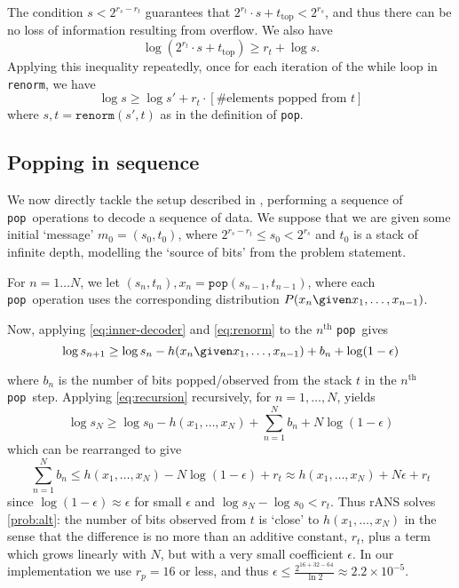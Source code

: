 \documentclass{article}
\newcommand{\pop}{\texttt{pop}}
\begin{document}
The condition \(s < 2^{r_s - r_t}\) guarantees that \(2^{r_t} \cdot s +
t_{\text{top}} < 2^{r_s}\), and thus there can be no loss of information
resulting from overflow. We also have
\begin{equation}
  \log (2^{r_t} \cdot s + t_\text{top}) \geq r_t + \log s.
\end{equation}
Applying this inequality repeatedly, once for each iteration of the while loop
in \texttt{renorm}, we have
\begin{equation}\label{eq:renorm}
\log s \geq \log s' + r_t\cdot\left[\text{\# elements popped from \(t\)}\right]
\end{equation}
where \(s, t = \texttt{renorm}(s', t)\) as in the definition of \pop.

\subsection{Popping in sequence}
We now directly tackle the setup described in , performing a
sequence of \pop\ operations to decode a sequence of data. We suppose that we
are given some initial `message' \(m_0= (s_0, t_0)\), where \(2^{r_s - r_t}
\leq s_0 < 2^{r_s}\) and \(t_0\) is a stack of infinite depth, modelling the
`source of bits' from the problem statement.

For \(n=1\ldots N\), we let \((s_n, t_n), x_n = \pop(s_{n-1}, t_{n-1})\), where
each \pop\ operation uses the corresponding distribution \(P(x_n\given
x_1,\ldots,x_{n-1})\).

Now, applying \cref{eq:inner-decoder} and \cref{eq:renorm} to the
\(n^\mathrm{th}\) \pop\ gives
\begin{equation}\label{eq:recursion}
  \log s_{n+1} \geq \log s_n - h(x_n\given x_1,\ldots,x_{n-1}) + b_n + \log (1
  - \epsilon)
\end{equation}

where \(b_n\) is the number of bits popped/observed from the stack \(t\) in the
\(n^{\mathrm{th}}\) \pop\ step. Applying \cref{eq:recursion} recursively, for
\(n=1,\ldots, N\), yields
\begin{equation}
  \log s_N \geq \log s_0 - h(x_1, \ldots, x_N) + \sum_{n=1}^{N} b_n +
  N\log(1-\epsilon)
\end{equation}
which can be rearranged to give
\begin{equation}
  \sum_{n=1}^Nb_n \leq h(x_1, \ldots, x_N) - N\log(1-\epsilon) + r_t
  \approx h(x_1, \ldots, x_N) + N\epsilon + r_t
\end{equation}
since \(\log(1 - \epsilon)\approx\epsilon\) for small \(\epsilon\) and \(\log
s_N - \log s_0 < r_t\). Thus rANS solves \cref{prob:alt}: the number of bits
observed from \(t\) is `close' to \(h(x_1,\ldots,x_N)\) in the sense that the
difference is no more than an additive constant, \(r_t\), plus a term which
grows linearly with \(N\), but with a very small coefficient \(\epsilon\). In
our implementation we use \(r_p = 16\) or less, and thus \(\epsilon \leq
\frac{2^{16 + 32 - 64}}{\ln 2} \approx 2.2\times 10^{-5}\).
\end{document}
